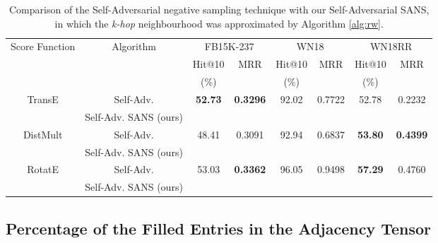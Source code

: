 

\begin{table*}[h]
\begin{small}
\centering
\begin{tabular}{cccccccc}
\hline
\multirow{3}{2cm}{\centering Score Function}& \multirow{3}{2cm}{Algorithm} & \multicolumn{2}{c}{FB15K-237} & \multicolumn{2}{c}{WN18} & \multicolumn{2}{c}{WN18RR} \\
& & Hit@10 & \multirow{2}{1cm}{\centering MRR} & Hit@10 & \multirow{2}{1cm}{\centering MRR} & Hit@10 & \multirow{2}{1cm}{\centering MRR} \\ 
& & (\%) & & (\%) & & (\%) & \\
\hline
\multirow{2}{1.5cm}{\centering TransE} & Self-Adv. \cite{sun2019rotate} & \textbf{52.73} & \textbf{0.3296} & 92.02 & 0.7722 & 52.78 & 0.2232 \\
& Self-Adv. SANS (ours) &  &  &  &  &  & \\
\hline
\multirow{2}{1.5cm}{\centering DistMult} & Self-Adv. & 48.41 & 0.3091 & 92.94  & 0.6837 & \textbf{53.80} & \textbf{0.4399} \\
& Self-Adv. SANS (ours) &  &  &  &  &  &  \\
\hline
\multirow{2}{1cm}{\centering RotatE} & Self-Adv. & 53.03 & \textbf{0.3362} & 96.05& 0.9498 & \textbf{57.29} & 0.4760 \\
& Self-Adv. SANS (ours) &  &  &  &  &  &  \\
\hline
\end{tabular}
\caption{Comparison of the Self-Adversarial negative sampling technique with our Self-Adversarial SANS, in which the \emph{k-hop} neighbourhood was approximated by Algorithm \ref{alg:rw}. 
}
\label{tab:comparison4}
\end{small}
\end{table*}


\cut{

}

\subsection{Percentage of the Filled Entries in the Adjacency Tensor}

